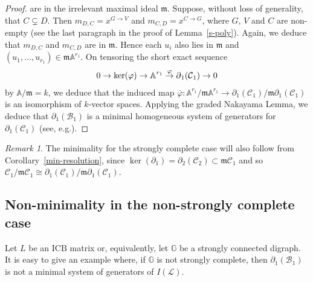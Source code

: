 \documentclass[10pt]{amsart}
\newcommand{\eg}{e.g.}
\newcommand{\mba}{\mbox{$\mathbb{A}$}}
\newcommand{\mbg}{\mbox{$\mathbb{G}$}}
\newcommand{\mcb}{\mbox{$\mathcal{B}$}}
\newcommand{\mcc}{\mbox{$\mathcal{C}$}}
\newcommand{\mcl}{\mbox{$\mathcal{L}$}}
\newcommand{\icb}{\mbox{$\mathrm{ICB}$}}
\newcommand{\mfm}{\mbox{$\mathfrak{m}$}}
\newcommand{\dif}{\mbox{$\partial$}}
\theoremstyle{definition}
\theoremstyle{remark}
\newtheorem{remark}[cdrthm]{Remark}
\begin{document}
\begin{proof}
are in the irrelevant maximal ideal $\mfm$. Suppose, without loss of
generality, that $C\subsetneq D$. Then $m_{D,C}=x^{G\to V}$ and
$m_{C,D}=x^{C\to G}$, where $G$, $V$ and $C$ are non-empty (see the
last paragraph in the proof of Lemma~\ref{s-poly}). Again, we deduce
that $m_{D,C}$ and $m_{C,D}$ are in $\mfm$. Hence each $u_i$ also lies
in $\mfm$ and $(u_1,\ldots ,u_{r_1})\in\mfm\mba^{r_1}$. On tensoring
the short exact sequence
\begin{eqnarray*}
0\to\ker(\varphi)\to\mba^{r_1}\buildrel{\varphi}\over{\to}\dif_1(\mcc_1)\to
0 
\end{eqnarray*}
by $\mba/\mfm=k$, we deduce that the induced map
$\overline{\varphi}:\mba^{r_1}/\mfm\mba^{r_1}
\to\dif_1(\mcc_1)/\mfm\dif_1(\mcc_1)$ is an isomorphism of $k$-vector
spaces. Applying the graded Nakayama Lemma, we deduce that
$\dif_1(\mcb_1)$ is a minimal homogeneous system of generators for
$\dif_1(\mcc_1)$ (see, \eg \cite[Exercise~1.5.24]{bh}).
\end{proof}

\begin{remark}
The minimality for the strongly complete case will also follow from
Corollary~\ref{min-resolution}, since
$\ker(\dif_1)=\dif_2(\mcc_2)\subset\mfm\mcc_1$ and so
$\mcc_1/\mfm\mcc_1\cong\dif_1(\mcc_1)/\mfm\dif_1(\mcc_1)$.
\end{remark}

\subsection{Non-minimality in the non-strongly complete case}

 Let $L$ be an $\icb$ matrix or, equivalently, let $\mbg$ be
a strongly connected digraph. It is easy to give an example where, if
$\mbg$ is not strongly complete, then $\dif_1(\mcb_1)$ is not a
minimal system of generators of $I(\mcl)$.
\end{document}
